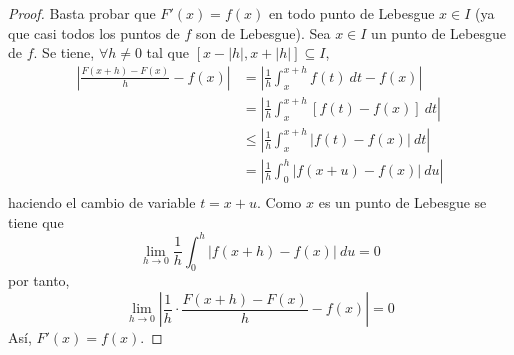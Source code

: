 \documentclass[12pt]{report}
\newcounter{it}
\theoremstyle{largebreak}
\renewcommand{\leq}{\ensuremath{\leqslant}}
\newcommand\abs[1]{\ensuremath{\left|#1\right|}}
\begin{document}
    \begin{proof}
        Basta probar que $F'(x)=f(x)$ en todo punto de Lebesgue $x\in I$ (ya que casi todos los puntos de $f$ son de Lebesgue). Sea $x\in I$ un punto de Lebesgue de $f$. Se tiene, $\forall h\neq0$ tal que $[x-\abs{h},x+\abs{h}]\subseteq I$,
        \begin{equation*}
            \begin{split}
                \abs{\frac{F(x+h)-F(x)}{h}-f(x)}&=\abs{\frac{1}{h}\int_x^{x+h}f(t)\:dt-f(x)}\\
                &=\abs{\frac{1}{h}\int_x^{x+h}\left[f(t)-f(x)\right]\:dt}\\
                &\leq\abs{\frac{1}{h}\int_x^{ x+h}\abs{f(t)-f(x)}\:dt}\\
                &=\abs{\frac{1}{h}\int_0^h\abs{f(x+u)-f(x)}\:du}\\
            \end{split}
        \end{equation*}
        haciendo el cambio de variable $t=x+u$. Como $x$ es un punto de Lebesgue se tiene que
        \begin{equation*}
            \lim_{ h\rightarrow0}\frac{1}{h}\int_0^h\abs{f(x+h)-f(x)}\:du=0
        \end{equation*}
        por tanto,
        \begin{equation*}
            \lim_{ h\rightarrow0}\abs{\frac{1}{h}\cdot\frac{F(x+h)-F(x)}{h}-f(x)}=0
        \end{equation*}
        Así, $F'(x)=f(x)$.
    \end{proof}
\end{document}
